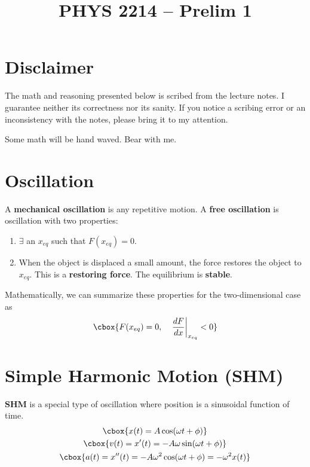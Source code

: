 \documentclass{hw}
\title{PHYS 2214 -- Prelim 1}
\renewcommand\emph[1]{{\bf\color{BlueViolet}#1}}
\begin{document}
\maketitle

\tableofcontents{}
\newpage{}

\section{Disclaimer}
The math and reasoning presented below is scribed from the lecture notes. I
guarantee neither its correctness nor its sanity. If you notice a scribing
error or an inconsistency with the notes, please bring it to my attention.

Some math will be hand waved. Bear with me.

\section{Oscillation}
A \emph{mechanical oscillation} is any repetitive motion. A \emph{free
oscillation} is oscillation with two properties:
\begin{enumerate}
  \item $\exists$ an $x_{eq}$ such that $F(x_{eq}) = 0$.
  \item When the object is displaced a small amount, the force restores the
    object to $x_{eq}$. This is a \emph{restoring force}. The equilibrium is
    \emph{stable}.
\end{enumerate}
Mathematically, we can summarize these properties for the two-dimensional case
as
\[\cbox{
  F(x_{eq}) = 0, \quad \left.\frac{dF}{dx}\right|_{x_{eq}} < 0
}\]

\section{Simple Harmonic Motion (SHM)}
\emph{SHM} is a special type of oscillation where position is a sinusoidal
function of time.
\begin{gather*}
  \cbox{x(t) = A\cos(\omega t + \phi)} \\
  \cbox{v(t) = x'(t) = -A \omega \sin(\omega t + \phi)} \\
  \cbox{a(t) = x''(t) = -A \omega^2 \cos(\omega t + \phi) = -\omega^2 x(t)} 
\end{gather*}
\end{document}
